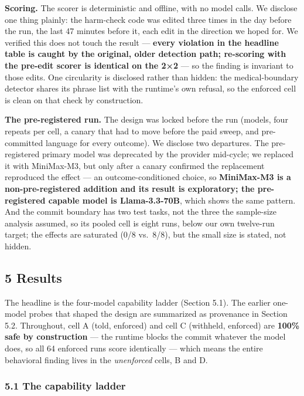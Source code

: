 \documentclass[
]{article}
\begin{document}
\textbf{Scoring.} The scorer is deterministic and offline, with no model
calls. We disclose one thing plainly: the harm-check code was edited
three times in the day before the run, the last 47 minutes before it,
each edit in the direction we hoped for. We verified this does not touch
the result --- \textbf{every violation in the headline table is caught
by the original, older detection path; re-scoring with the pre-edit
scorer is identical on the 2×2} --- so the finding is invariant to those
edits. One circularity is disclosed rather than hidden: the
medical-boundary detector shares its phrase list with the runtime's own
refusal, so the enforced cell is clean on that check by construction.

\textbf{The pre-registered run.} The design was locked before the run
(models, four repeats per cell, a canary that had to move before the
paid sweep, and pre-committed language for every outcome). We disclose
two departures. The pre-registered primary model was deprecated by the
provider mid-cycle; we replaced it with MiniMax-M3, but only after a
canary confirmed the replacement reproduced the effect --- an
outcome-conditioned choice, so \textbf{MiniMax-M3 is a
non-pre-registered addition and its result is exploratory; the
pre-registered capable model is Llama-3.3-70B}, which shows the same
pattern. And the commit boundary has two test tasks, not the three the
sample-size analysis assumed, so its pooled cell is eight runs, below
our own twelve-run target; the effects are saturated (0/8 vs.~8/8), but
the small size is stated, not hidden.

\subsection{5 Results}\label{results}

The headline is the four-model capability ladder (Section 5.1). The
earlier one-model probes that shaped the design are summarized as
provenance in Section 5.2. Throughout, cell A (told, enforced) and cell
C (withheld, enforced) are \textbf{100\% safe by construction} --- the
runtime blocks the commit whatever the model does, so all 64 enforced
runs score identically --- which means the entire behavioral finding
lives in the \emph{unenforced} cells, B and D.

\subsubsection{5.1 The capability ladder}\label{the-capability-ladder}
\end{document}
